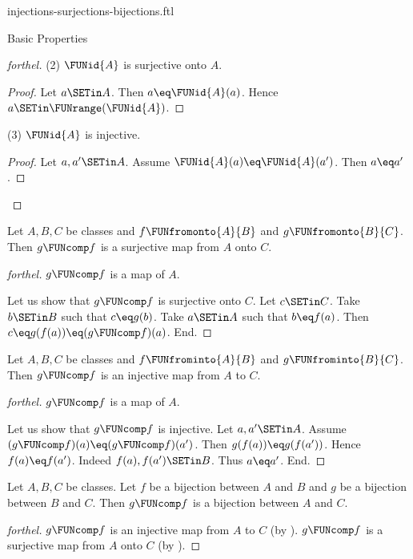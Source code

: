 \documentclass{naproche-library}
\begin{document}
\begin{smodule}[title={Injective, Surjective and Bijective Maps}]{injections-surjections-bijections.ftl}
\begin{sfragment}{Basic Properties}
\begin{proof}[forthel]
    (2) $\FUNid{A}$ is surjective onto $A$.
    \begin{proof}
      Let $a \SETin A$.
      Then $a \eq \FUNid{A}(a)$.
      Hence $a \SETin \FUNrange(\FUNid{A})$.
    \end{proof}

    (3) $\FUNid{A}$ is injective.
    \begin{proof}
      Let $a, a' \SETin A$.
      Assume $\FUNid{A}(a) \eq \FUNid{A}(a')$.
      Then $a \eq a'$.
    \end{proof}
  \end{proof}

  \begin{proposition}[forthel,id=FOUNDATIONS_08_8542698338254848]
    Let $A, B, C$ be classes and $f \FUNfromonto{A}{B}$ and $g \FUNfromonto{B}{C}$.
    Then $g \FUNcomp f$ is a surjective map from $A$ onto $C$.
  \end{proposition}
  \begin{proof}[forthel]
    $g \FUNcomp f$ is a map of $A$.

    Let us show that $g \FUNcomp f$ is surjective onto $C$.
      Let $c \SETin C$.
      Take $b \SETin B$ such that $c \eq g(b)$.
      Take $a \SETin A$ such that $b \eq f(a)$.
      Then $c \eq g(f(a)) \eq (g \FUNcomp f)(a)$.
    End.
  \end{proof}

  \begin{proposition}[forthel,id=FOUNDATIONS_08_3367836856614912]
    Let $A, B, C$ be classes and $f \FUNfrominto{A}{B}$ and $g \FUNfrominto{B}{C}$.
    Then $g \FUNcomp f$ is an injective map from $A$ to $C$.
  \end{proposition}
  \begin{proof}[forthel]
    $g \FUNcomp f$ is a map of $A$.

    Let us show that $g \FUNcomp f$ is injective.
      Let $a, a' \SETin A$.
      Assume $(g \FUNcomp f)(a) \eq (g \FUNcomp f)(a')$.
      Then $g(f(a)) \eq g(f(a'))$.
      Hence $f(a) \eq f(a')$.
      Indeed $f(a), f(a') \SETin B$.
      Thus $a \eq a'$.
    End.
  \end{proof}

  \begin{corollary}[forthel,id=FOUNDATIONS_08_6435206693126144]
    Let $A, B, C$ be classes.
    Let $f$ be a bijection between $A$ and $B$ and $g$ be a bijection between $B$ and $C$.
    Then $g \FUNcomp f$ is a bijection between $A$ and $C$.
  \end{corollary}
  \begin{proof}[forthel]
    $g \FUNcomp f$ is an injective map from $A$ to $C$ (by ).
    $g \FUNcomp f$ is a surjective map from $A$ onto $C$ (by ).
  \end{proof}


\end{sfragment}
\end{smodule}
\end{document}
